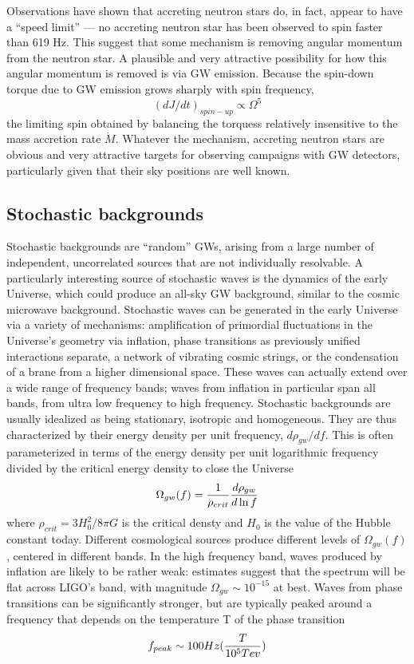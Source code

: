 \documentclass[binding=0.6cm, LaM]{sapthesis}
\begin{document}
Observations have shown that accreting neutron stars do, in fact, appear to have a “speed limit” — no accreting neutron star has been observed to spin faster than 619 Hz.
This suggest that some mechanism is removing angular momentum from the neutron star.
A plausible and very attractive possibility for how this angular momentum is removed is via GW emission. Because the spin-down torque
due to GW emission grows sharply with spin frequency,
\begin{equation}
(dJ/dt)_{spin-up} \propto \Omega^5 
\end{equation}
the limiting spin obtained by balancing the torquess relatively insensitive to the mass accretion rate $\dot M$.
Whatever the mechanism, accreting neutron stars are obvious and very attractive targets for observing campaigns with GW detectors, particularly given that their sky positions are well known.




\subsection{Stochastic backgrounds}
Stochastic backgrounds are “random” GWs, arising from a large number of independent, uncorrelated sources that are not individually resolvable.
A particularly interesting source of stochastic waves is the dynamics of the early Universe, which could produce an all-sky GW background, similar to the cosmic microwave background.
Stochastic waves can be generated in the early Universe via a variety of mechanisms: amplification of primordial fluctuations in the Universe’s geometry via inflation, phase transitions as previously
unified interactions separate, a network of vibrating cosmic strings, or the condensation of a brane from a higher dimensional space.
These waves can actually extend over a wide range of frequency bands; waves from inflation in particular span all bands, from ultra low frequency to high frequency.
 Stochastic backgrounds are usually idealized as being stationary, isotropic and homogeneous. They are thus characterized by their energy density per unit frequency, $d\rho_{gw}/df$.
This is often parameterized in terms of the energy density per unit logarithmic frequency divided by the critical energy density to close the Universe
\begin{equation}
\Omega_{gw}(f) = {1 \over {\rho_{crit}}}{{d\rho_{gw}}\over{d\ln{f}}}
\end{equation}
where $\rho_{crit} = 3H_0^2/8\pi G$ is the critical densty and $H_0$ is the value of the Hubble constant today.
 Different cosmological sources produce different levels of $\Omega_{gw}(f)$, centered in different bands.
In the high frequency band, waves produced by inflation are likely to be rather weak: estimates suggest that the spectrum will be flat across LIGO’s band,
with magnitude $\Omega_{gw} \sim 10^{-15}$ at best.
Waves from phase transitions can be significantly stronger, but are typically peaked around a frequency that depends on the temperature T of the phase transition
\begin{equation}
f_{peak} \sim 100Hz({T \over {10^5 Tev}})
\end{equation}
\end{document}
